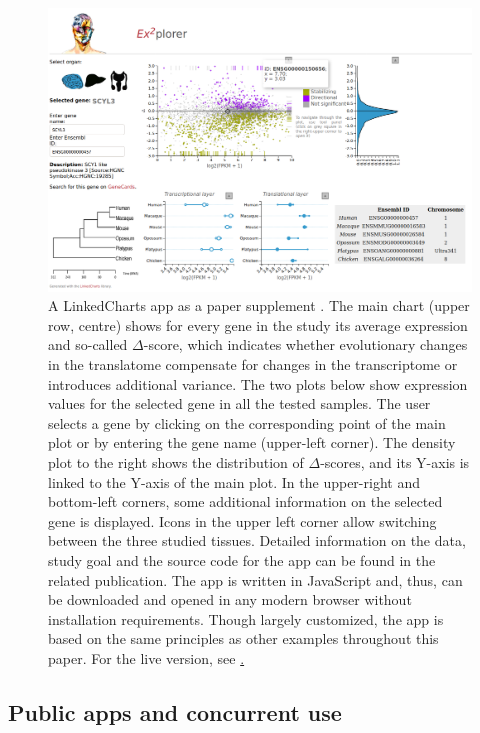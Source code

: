 \documentclass[twocolumn,10pt]{article}
\begin{document}
\begin{figure}[t]
   \includegraphics[width=\textwidth]{FigF/figF.png}
   \caption{A LinkedCharts app as a paper supplement \cite{wang_2020}. The main chart (upper row, centre) shows for every gene in the study its average expression and so-called $\Delta$-score, which indicates whether evolutionary changes in the translatome compensate for changes in the transcriptome or introduces additional variance. The two plots below show expression values for the selected gene in all the tested samples. The user selects a gene by clicking on the corresponding point of the main plot or by entering the gene name (upper-left corner). The density plot to the right shows the distribution of $\Delta$-scores, and its Y-axis is linked to the Y-axis of the main plot. In the upper-right and bottom-left corners, some additional information on the selected gene is displayed. Icons in the upper left corner allow switching between the three studied tissues. Detailed information on the data, study goal and the source code for the app can be found in the related publication. The app is written in JavaScript and, thus, can be downloaded and opened in any modern browser without installation requirements. Though largely customized, the app is based on the same principles as other examples throughout this paper. For the live version, see \href{https://ex2plorer.kaessmannlab.org/}.}
   \label{FigF}
\end{figure}

\subsection{Public apps and concurrent use}
\end{document}
